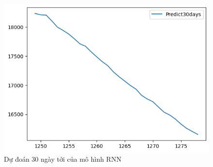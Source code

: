 \begin{figure}[H]
\begin{minipage}{0.15\textwidth}
    \includegraphics[width=1\textwidth]{resources/chapter-5/predicted/EIB_ RNN_9-1_30days.png}
    \end{minipage}
    \hfill
    
    \caption{Dự đoán 30 ngày tới của mô hình RNN}
    \label{fig:RNN_predicted}
\end{figure}




